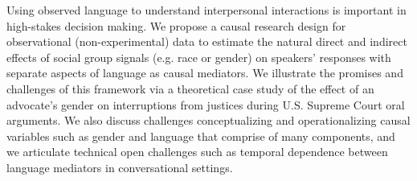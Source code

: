 Using observed language to understand interpersonal interactions is important in high-stakes decision making. We propose a causal research design for observational (non-experimental) data to estimate the natural direct and indirect effects of social group signals (e.g. race or gender) on speakers' responses with separate aspects of language as causal mediators. We illustrate the promises and challenges of this framework via a theoretical case study of the effect of an advocate's gender on interruptions from justices during U.S. Supreme Court oral arguments. We also discuss challenges conceptualizing and operationalizing causal variables such as gender and language that comprise of many components, and we articulate technical open challenges such as temporal dependence between language mediators in conversational settings.
